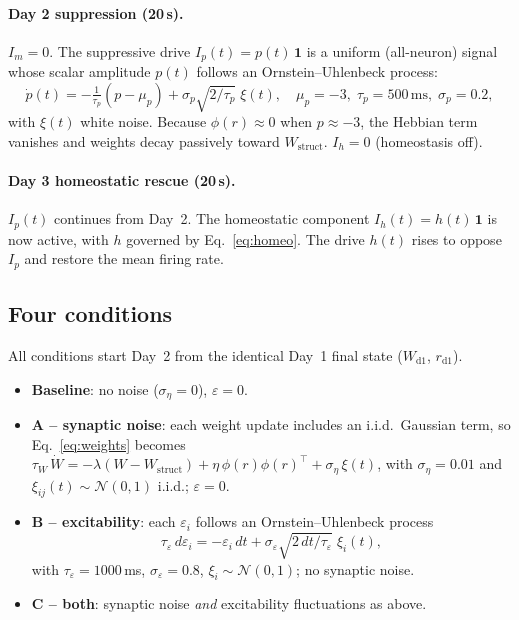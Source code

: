 \documentclass[11pt,a4paper]{article}
\begin{document}
\paragraph{Day 2 \textemdash{} suppression (20\,s).}
$I_m = 0$.  The suppressive drive $I_p(t) = p(t)\,\mathbf{1}$
is a uniform (all-neuron) signal whose scalar amplitude $p(t)$ follows
an Ornstein--Uhlenbeck process:
\begin{equation}
\dot{p}(t) = -\tfrac{1}{\tau_p}(p - \mu_p) + \sigma_p\sqrt{2/\tau_p}\;\xi(t),
\quad \mu_p = -3,\; \tau_p = 500\,\text{ms},\; \sigma_p = 0.2,
\label{eq:Ip_ou}
\end{equation}
with $\xi(t)$ white noise.
Because $\phi(r) \approx 0$ when $p \approx -3$, the Hebbian term vanishes
and weights decay passively toward $W_\mathrm{struct}$.
$I_h = 0$ (homeostasis off).

\paragraph{Day 3 \textemdash{} homeostatic rescue (20\,s).}
$I_p(t)$ continues from Day~2.
The homeostatic component $I_h(t) = h(t)\,\mathbf{1}$ is now active,
with $h$ governed by Eq.~\eqref{eq:homeo}.
The drive $h(t)$ rises to oppose $I_p$ and restore the mean firing rate.

\subsection{Four conditions}

All conditions start Day~2 from the identical Day~1 final state
($W_\mathrm{d1}$, $r_\mathrm{d1}$).

\begin{itemize}\setlength\itemsep{1pt}
\item \textbf{Baseline}: no noise ($\sigma_\eta=0$), $\varepsilon=0$.
\item \textbf{A -- synaptic noise}: each weight update includes an i.i.d.\
  Gaussian term, so Eq.~\eqref{eq:weights} becomes
  $\tau_W\,\dot{W} = -\lambda(W-W_\mathrm{struct}) + \eta\,\phi(r)\phi(r)^\top
  + \sigma_\eta\,\xi(t)$,
  with $\sigma_\eta = 0.01$ and $\xi_{ij}(t)\sim\mathcal{N}(0,1)$ i.i.d.;
  $\varepsilon=0$.
\item \textbf{B -- excitability}: each $\varepsilon_i$ follows an
  Ornstein--Uhlenbeck process
  \begin{equation}
    \tau_\varepsilon\,d\varepsilon_i = -\varepsilon_i\,dt
      + \sigma_\varepsilon\sqrt{2\,dt/\tau_\varepsilon}\;\xi_i(t),
    \label{eq:ou}
  \end{equation}
  with $\tau_\varepsilon=1000$\,ms, $\sigma_\varepsilon=0.8$,
  $\xi_i\sim\mathcal{N}(0,1)$; no synaptic noise.
\item \textbf{C -- both}: synaptic noise \emph{and} excitability fluctuations
  as above.
\end{itemize}
\end{document}
